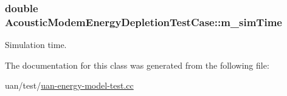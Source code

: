 \subsubsection[{\texorpdfstring{m\+\_\+sim\+Time}{m_simTime}}]{\setlength{\rightskip}{0pt plus 5cm}double Acoustic\+Modem\+Energy\+Depletion\+Test\+Case\+::m\+\_\+sim\+Time}\hypertarget{classAcousticModemEnergyDepletionTestCase_ae081c5442fcc0406d5d002c20540e0a5}{}\label{classAcousticModemEnergyDepletionTestCase_ae081c5442fcc0406d5d002c20540e0a5}


Simulation time. 



The documentation for this class was generated from the following file\+:\begin{DoxyCompactItemize}
\item 
uan/test/\hyperlink{uan-energy-model-test_8cc}{uan-\/energy-\/model-\/test.\+cc}\end{DoxyCompactItemize}
